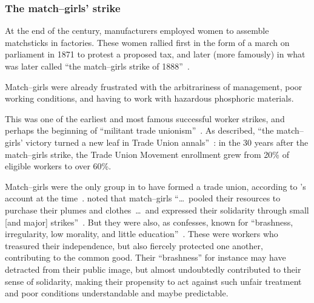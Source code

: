 \documentclass[trackingWork]{subfiles}
\begin{document}
\subsubsection{The match--girls' strike}

At the end of the  century,
manufacturers employed women to assemble matchsticks in factories.
These women rallied first in the form of a march on parliament in 1871 to protest a proposed tax, and 
later (more famously) in what was later called ``the match--girls strike of 1888''~\cite{10.2307/3827491}.

Match--girls were already frustrated with
the arbitrariness of management,
poor working conditions, and
having to work with hazardous phosphoric materials.

This was one of the earliest and most famous successful worker strikes,
and perhaps the beginning of ``militant trade unionism''~\cite{10.2307/3827491}.
As \citeauthor{weyer1894history} described,
``the match--girls' victory turned a new leaf in Trade Union annals''~\cite{weyer1894history}: in the 30 years after the match--girls strike,
the Trade Union Movement enrollment grew from 20\% of eligible workers to over 60\%.

Match--girls were the only group in \citeyear{booth1903life} to have formed a trade union,
according to \citeauthor{booth1903life}'s account at the time~\cite{booth1903life}.
\citeauthor{10.2307/3827491} noted that match--girls
``\dots~pooled their resources to purchase their plumes and clothes~\dots~and expressed their solidarity through small [and major] strikes''~\cite{booth1903life}.
But they were also, as \citeauthor{10.2307/3827491} confesses, known for ``brashness, irregularity, low morality, and little education''~\cite{10.2307/3827491}.
These were workers who treasured their independence, but also fiercely protected one another, contributing to the common good.
Their ``brashness'' for instance may have detracted from their public image, but almost undoubtedly contributed to their sense of solidarity,
making their propensity to act against such unfair treatment and poor conditions understandable and maybe predictable.
\end{document}
